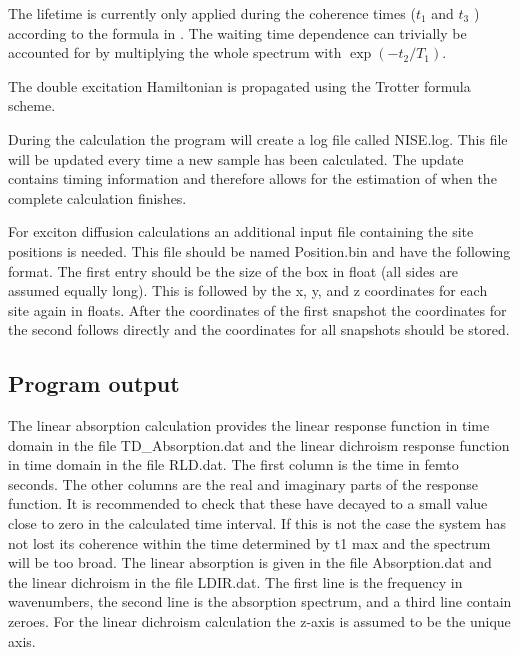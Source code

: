 The lifetime is currently only applied during the coherence times ($t_1$ and $t_3$ ) according 
to the formula in \cite{Liang.2012.JCTC.8.1706}. The waiting time dependence can trivially be accounted for by 
multiplying the whole spectrum with $\exp( -t_2 /T_1 )$.

The double excitation Hamiltonian is propagated using the Trotter formula scheme\cite{Paarmann.2008.JCP.128.191103,Jansen.2010.JCP.132.224503}.

During the calculation the program will create a log file called NISE.log. This file will be updated
every time a new sample has been calculated. The update contains timing information and
therefore allows for the estimation of when the complete calculation finishes.

For exciton diffusion calculations an additional input file containing the site positions is needed.
This file should be named Position.bin and have the following format. The first entry should be the
size of the box in float (all sides are assumed equally long). This is followed by the x, y, and z coordinates for each site again in floats. After the coordinates of the first snapshot the coordinates
for the second follows directly and the coordinates for all snapshots should be stored.


\subsection{Program output}
The linear absorption calculation provides the linear response function in time domain in the file TD\_Absorption.dat 
and the linear dichroism response function in time domain in the file RLD.dat. The first 
column is the time in femto seconds. The other columns are the real and imaginary parts 
of the response function. It is recommended to check that these have decayed to a small 
value close to zero in the calculated time interval. If this is not the case the system has 
not lost its coherence within the time determined by t1 max and the spectrum will be 
too broad. The linear absorption is given in the file Absorption.dat and the linear dichroism in 
the file LDIR.dat. The first line is the frequency in wavenumbers, the second line is the 
absorption spectrum, and a third line contain zeroes. For the linear dichroism calculation 
the z-axis is assumed to be the unique axis. 

